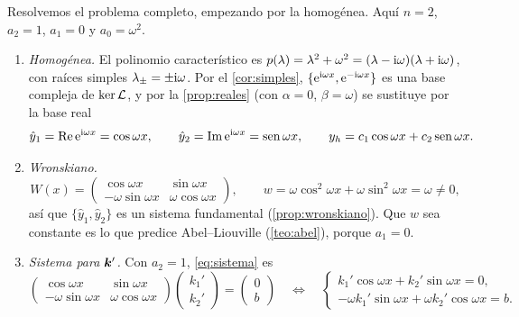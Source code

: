 \begin{ejemplo}[Oscilador forzado, $y''+\omega^{2}y=b(x)$, con $\omega>0$]\label{ej:forzado}
Resolvemos el problema completo, empezando por la homogénea. Aquí $n=2$,
$a_2=1$, $a_1=0$ y $a_0=\omega^{2}$.
\begin{enumerate}[label=\textcolor{cian}{\arabic*.}, leftmargin=1.5em, itemsep=4pt]
  \item \emph{Homogénea.} El polinomio característico es
        $p(\lambda)=\lambda^{2}+\omega^{2}=(\lambda-\mathrm{i}\omega)(\lambda+\mathrm{i}\omega)$,
        con raíces simples $\lambda_\pm=\pm\mathrm{i}\omega$. Por el
        \cref{cor:simples}, $\{\mathrm{e}^{\mathrm{i}\omega x},\mathrm{e}^{-\mathrm{i}\omega x}\}$ es una
        base compleja de $\operatorname{ker}\mathcal{L}$, y por la \cref{prop:reales} (con
        $\alpha=0$, $\beta=\omega$) se sustituye por la base real
        \[
          \hat y_1=\operatorname{Re}\mathrm{e}^{\mathrm{i}\omega x}=\cos\omega x,\qquad
          \hat y_2=\operatorname{Im}\mathrm{e}^{\mathrm{i}\omega x}=\operatorname{sen}\omega x,\qquad
          y_h=c_1\cos\omega x+c_2\operatorname{sen}\omega x .
        \]
  \item \emph{Wronskiano.}
        \[
          W(x)=\begin{pmatrix}\cos\omega x & \sin\omega x\\ -\omega\sin\omega x & \omega\cos\omega x\end{pmatrix},
          \qquad
          w=\omega\cos^{2}\omega x+\omega\sin^{2}\omega x=\omega\neq0 ,
        \]
        así que $\{\hat y_1,\hat y_2\}$ es un sistema fundamental
        (\cref{prop:wronskiano}). Que $w$ sea constante es lo que predice
        Abel--Liouville (\cref{teo:abel}), porque $a_1=0$.
  \item \emph{Sistema para $\bm{k}'$.} Con $a_2=1$, \eqref{eq:sistema} es
        \[
          \begin{pmatrix}\cos\omega x & \sin\omega x\\ -\omega\sin\omega x & \omega\cos\omega x\end{pmatrix}
          \begin{pmatrix}k_1'\\ k_2'\end{pmatrix}
          =\begin{pmatrix}0\\ b\end{pmatrix}
          \quad\Longleftrightarrow\quad
          \begin{cases}
            k_1'\cos\omega x+k_2'\sin\omega x=0,\\
            -\omega k_1'\sin\omega x+\omega k_2'\cos\omega x=b .
          \end{cases}
\]
\end{enumerate}
\end{ejemplo}
